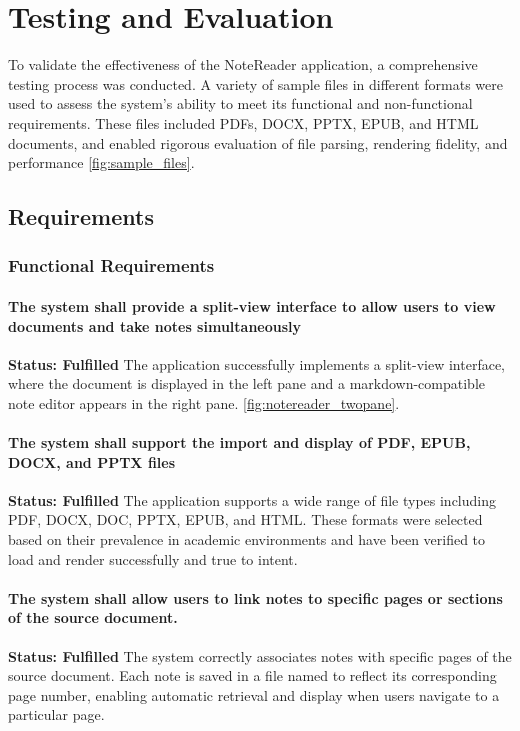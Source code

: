 
\chapter{Testing and Evaluation}
\label{chap:eval}

To validate the effectiveness of the NoteReader application, a comprehensive testing process was conducted. A variety of sample files in different formats were used to assess the system’s ability to meet its functional and non-functional requirements. These files included PDFs, DOCX, PPTX, EPUB, and HTML documents, and enabled rigorous evaluation of file parsing, rendering fidelity, and performance \ref{fig:sample_files}.


\section{Requirements}

    \subsection{Functional Requirements}
            \subsubsection{
            The system shall provide a split-view interface to allow users to view documents and take notes simultaneously}
            \textbf{Status: Fulfilled}   \newline
            The application successfully implements a split-view interface, where the document is displayed in the left pane and a markdown-compatible note editor appears in the right pane. \ref{fig:notereader_twopane}.
            
            \subsubsection {
            The system shall support the import and display of PDF, EPUB, DOCX, and PPTX files}            
            \textbf{Status: Fulfilled}   \newline
            The application supports a wide range of file types including PDF, DOCX, DOC, PPTX, EPUB, and HTML. These formats were selected based on their prevalence in academic environments and have been verified to load and render successfully and true to intent.
            
            \subsubsection {
            The system shall allow users to link notes to specific pages or sections of the source document.}            
            \textbf{Status: Fulfilled}  \newline
            The system correctly associates notes with specific pages of the source document. Each note is saved in a file named to reflect its corresponding page number, enabling automatic retrieval and display when users navigate to a particular page.
            
